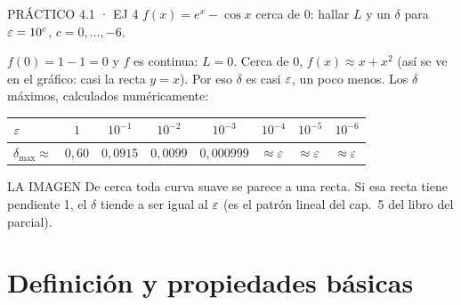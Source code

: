 \begin{enunciado}{PRÁCTICO 4.1 · EJ 4}
$f(x)=e^x-\cos x$ cerca de 0: hallar $L$ y un $\delta$ para $\varepsilon=10^c$, $c=0,\dots,-6$.
\end{enunciado}
$f(0)=1-1=0$ y $f$ es continua: $L=0$. Cerca de 0, $f(x)\approx x+x^2$ (así se ve en el gráfico: casi la recta $y=x$). Por eso $\delta$ es casi $\varepsilon$, un poco menos. Los $\delta$ máximos, calculados numéricamente:
\begin{center}\small
\begin{tabular}{@{}lccccccc@{}}\toprule
$\varepsilon$ & $1$ & $10^{-1}$ & $10^{-2}$ & $10^{-3}$ & $10^{-4}$ & $10^{-5}$ & $10^{-6}$\\\midrule
$\delta_{\max}\approx$ & $0{,}60$ & $0{,}0915$ & $0{,}0099$ & $0{,}000999$ & $\approx\varepsilon$ & $\approx\varepsilon$ & $\approx\varepsilon$\\\bottomrule
\end{tabular}
\end{center}
\begin{tip}{LA IMAGEN}
De cerca toda curva suave se parece a una recta. Si esa recta tiene pendiente 1, el $\delta$ tiende a ser igual al $\varepsilon$ (es el patrón lineal del cap.\ 5 del libro del parcial).
\end{tip}

\section{Definición y propiedades básicas}

